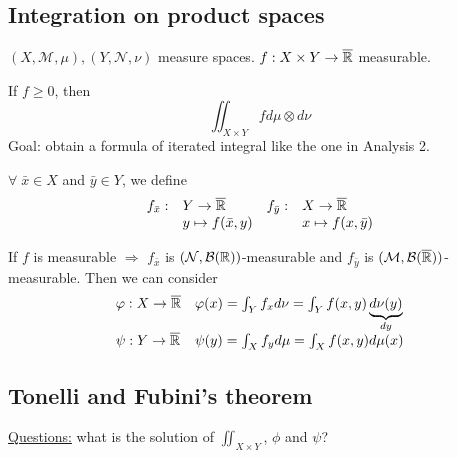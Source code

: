 \subsection{Integration on product spaces}
\((X, \mathcal{M}, \mu), (Y, \mathcal{N},\nu)\) measure spaces. \(f : X \times Y \to \overline{\mathbb{R}}\) measurable.

If \(f \geq 0\), then 
\[
    \iint_{X \times Y} f d\mu\otimes d\nu
\]
Goal: obtain a formula of iterated integral like the one in Analysis 2.

\(\forall \; \bar{x} \in X\) and \(\bar{y} \in Y\), we define
\[
    \begin{array}{llll}
        f_{\bar{x}} :& Y \to \overline{\mathbb{R}} & f_{\bar{y}}:& X \to \overline{\mathbb{R}}  \\
        & y \mapsto f(\bar{x}, y) & & x \mapsto f(x, \bar{y})

    \end{array}
\]
\begin{proposition}
    If \(f\) is measurable \(\Rightarrow\) \(f_{\bar{x}}\) is \((\mathcal{N}, \mathcal{B}(\mathbb{R}))\)-measurable and \(f_{\bar{y}}\) is \((\mathcal{M}, \mathcal{B}(\overline{\mathbb{R}}))\)-measurable.
    Then we can consider
    \[
        \begin{array}{ll}    
        \varphi : X \to \overline{\mathbb{R}} & 
        \varphi(x) = \int_Y f_x d\nu = \int_Y f(x,y) \underbrace{d\nu(y)}_{dy} \\
        \psi : Y \to \overline{\mathbb{R}} &
        \psi(y) = \int_X f_y d\mu = \int_X f(x,y) d\mu(x)
    \end{array}
    \]
\end{proposition}
\subsection{Tonelli and Fubini's theorem}
\noindent\underline{Questions:} what is the solution of \(\iint_{X \times Y}\), \(\phi\) and \(\psi\)?

